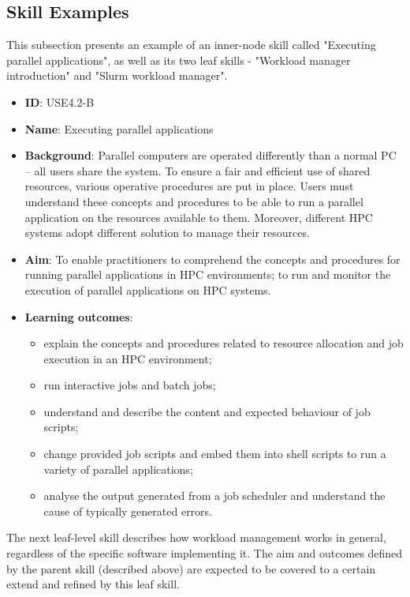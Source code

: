 \documentclass[jocse]{jocseart}
\begin{document}
\subsection{Skill Examples}

This subsection presents an example of an inner-node skill called "Executing parallel applications", as well as its two leaf skills - "Workload manager introduction" and "Slurm workload manager".

\begin{itemize}
  \item \textbf{ID}: USE4.2-B
  \item \textbf{Name}: Executing parallel applications
  \item \textbf{Background}:
  Parallel computers are operated differently than a normal PC -- all users share the system. To ensure a fair and efficient use of shared resources, various operative procedures are put in place. Users must understand these concepts and procedures to be able to run a parallel application on the resources available to them. Moreover, different HPC systems adopt different solution to manage their resources.
  \item \textbf{Aim}: To enable practitioners to comprehend the concepts and procedures for running parallel applications in HPC environments; to run and monitor the execution of parallel applications on HPC systems.

  \item \textbf{Learning outcomes}:
    \begin{itemize}
    \item explain the concepts and procedures related to resource allocation and job execution in an HPC environment;
    \item run interactive jobs and batch jobs;
    \item understand and describe the content and expected behaviour of job scripts;
    \item change provided job scripts and embed them into shell scripts to run a variety of parallel applications;
    \item analyse the output generated from a job scheduler and understand the cause of typically generated errors.
    \end{itemize}
\end{itemize}

The next leaf-level skill describes how workload management works in general, regardless of the specific software implementing it.
The aim and outcomes defined by the parent skill (described above) are expected to be covered to a certain extend and refined by this leaf skill.
\end{document}
